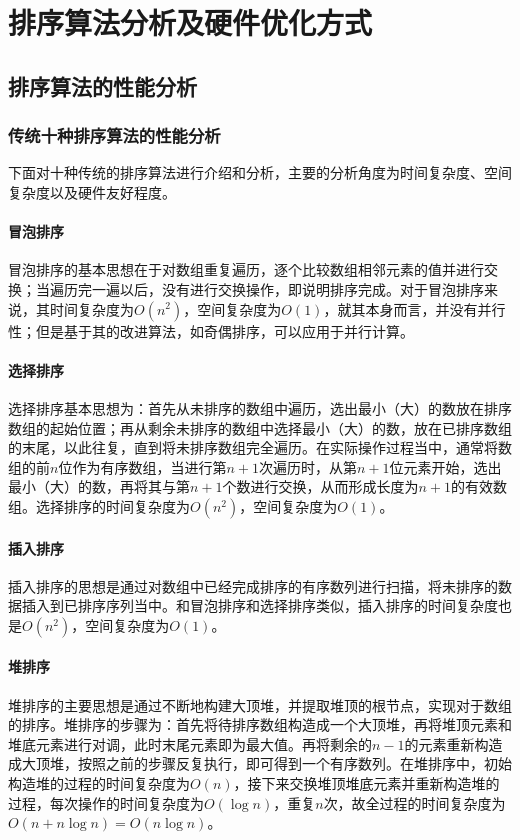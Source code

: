 
\chapter{排序算法分析及硬件优化方式}
\label{chap:sort_algorithm_intro}

\section{排序算法的性能分析}
\subsection{传统十种排序算法的性能分析}
下面对十种传统的排序算法进行介绍和分析，主要的分析角度为时间复杂度、空间复杂度以及硬件友好程度。

\subsubsection{冒泡排序}
    冒泡排序的基本思想在于对数组重复遍历，逐个比较数组相邻元素的值并进行交换；当遍历完一遍以后，没有进行交换操作，即说明排序完成。对于冒泡排序来说，其时间复杂度为$O(n^2)$，空间复杂度为$O(1)$，就其本身而言，并没有并行性；但是基于其的改进算法，如奇偶排序，可以应用于并行计算。

\subsubsection{选择排序}
    选择排序基本思想为：首先从未排序的数组中遍历，选出最小（大）的数放在排序数组的起始位置；再从剩余未排序的数组中选择最小（大）的数，放在已排序数组的末尾，以此往复，直到将未排序数组完全遍历。在实际操作过程当中，通常将数组的前$n$位作为有序数组，当进行第$n+1$次遍历时，从第$n+1$位元素开始，选出最小（大）的数，再将其与第$n+1$个数进行交换，从而形成长度为$n+1$的有效数组。选择排序的时间复杂度为$O(n^2)$，空间复杂度为$O(1)$。

\subsubsection{插入排序}
    插入排序的思想是通过对数组中已经完成排序的有序数列进行扫描，将未排序的数据插入到已排序序列当中。和冒泡排序和选择排序类似，插入排序的时间复杂度也是$O(n^2)$，空间复杂度为$O(1)$。

\subsubsection{堆排序}
    堆排序的主要思想是通过不断地构建大顶堆，并提取堆顶的根节点，实现对于数组的排序。堆排序的步骤为：首先将待排序数组构造成一个大顶堆，再将堆顶元素和堆底元素进行对调，此时末尾元素即为最大值。再将剩余的$n-1$的元素重新构造成大顶堆，按照之前的步骤反复执行，即可得到一个有序数列。在堆排序中，初始构造堆的过程的时间复杂度为$O(n)$，接下来交换堆顶堆底元素并重新构造堆的过程，每次操作的时间复杂度为$O(\log n)$，重复$n$次，故全过程的时间复杂度为$O(n+n\log n)=O(n\log n)$。

